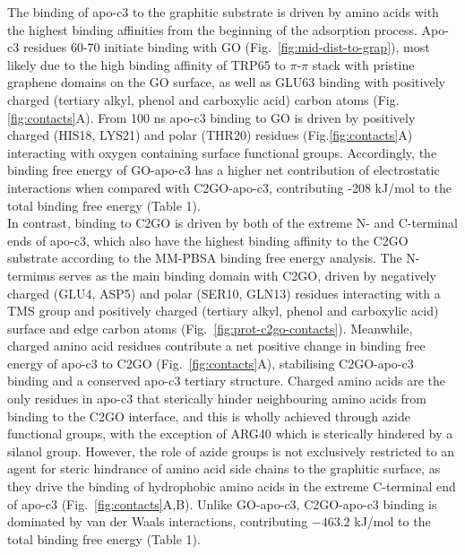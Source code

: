 The binding of apo-c3 to the graphitic substrate is driven by amino acids with the highest binding affinities from the beginning of the adsorption process. Apo-c3 residues 60-70 initiate binding with GO (Fig.~\ref{fig:mid-dist-to-grap}), most likely due to the high binding affinity of TRP65 to $\pi$-$\pi$ stack with pristine graphene domains on the GO surface, as well as GLU63 binding with positively charged (tertiary alkyl, phenol and carboxylic acid) carbon atoms (Fig.\ref{fig:contacts}A). From 100 ns apo-c3 binding to GO is driven by positively charged (HIS18, LYS21) and polar (THR20) residues (Fig.\ref{fig:contacts}A) interacting with oxygen containing surface functional groups. Accordingly, the binding free energy of GO-apo-c3 has a higher net contribution of electrostatic interactions when compared with C2GO-apo-c3, contributing -208 kJ/mol to the total binding free energy (Table 1). \\

In contrast, binding to C2GO is driven by both of the extreme N- and C-terminal ends of apo-c3, which also have the highest binding affinity to the C2GO substrate according to the MM-PBSA binding free energy analysis. The N-terminus serves as the main binding domain with C2GO, driven by negatively charged (GLU4, ASP5) and polar (SER10, GLN13) residues interacting with a TMS group and positively charged (tertiary alkyl, phenol and carboxylic acid) surface and edge carbon atoms (Fig.~\ref{fig:prot-c2go-contacts}). Meanwhile, charged amino acid residues contribute a net positive change in binding free energy of apo-c3 to C2GO  (Fig.~\ref{fig:contacts}A), stabilising C2GO-apo-c3 binding and a conserved apo-c3 tertiary structure. Charged amino acids are the only residues in apo-c3 that sterically hinder neighbouring amino acids from binding to the C2GO interface, and this is wholly achieved through azide functional groups, with the exception of ARG40 which is sterically hindered by a silanol group. However, the role of azide groups is not exclusively restricted to an agent for steric hindrance of amino acid side chains to the graphitic surface, as they drive the binding of hydrophobic amino acids in the extreme C-terminal end of apo-c3 (Fig.~\ref{fig:contacts}A,B). Unlike GO-apo-c3, C2GO-apo-c3 binding is dominated by van der Waals interactions, contributing $-463.2$ kJ/mol to the total binding free energy (Table 1). \\

